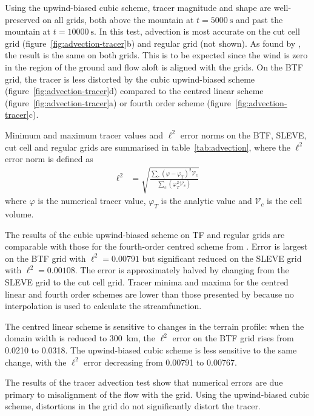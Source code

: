 \documentclass[twocol]{ametsoc}
\begin{document}
Using the upwind-biased cubic scheme, tracer magnitude and shape are well-preserved on all grids, both above the mountain at \(t = \SI{5000}{\second}\) and past the mountain at \(t = \SI{10000}{\second}\).  In this test, advection is most accurate on the cut cell grid (figure~\ref{fig:advection-tracer}b) and regular grid (not shown).  As found by \citet{good2014}, the result is the same on both grids.  This is to be expected since the wind is zero in the region of the ground and flow aloft is aligned with the grids.  On the BTF grid, the tracer is less distorted by the cubic upwind-biased scheme (figure~\ref{fig:advection-tracer}d) compared to the centred linear scheme (figure~\ref{fig:advection-tracer}a) or fourth order scheme (figure~\ref{fig:advection-tracer}c).

Minimum and maximum tracer values and \(\ell^2\) error norms on the BTF, SLEVE, cut cell and regular grids are summarised in table~\ref{tab:advection}, where the \(\ell^2\) error norm is defined as 
\begin{align}
	\ell^2 &= \sqrt{\frac{\sum_c \left( \varphi - \varphi_{T} \right)^2 \mathcal{V}_c}{\sum_c \left( \varphi_T^2 \mathcal{V}_c \right)}}
\end{align}
where $\varphi$ is the numerical tracer value, $\varphi_T$ is the analytic value and $\mathcal{V}_c$ is the cell volume.

The results of the cubic upwind-biased scheme on TF and regular grids are comparable with those for the fourth-order centred scheme from \citet{schaer2002}.  Error is largest on the BTF grid with \(\ell^2 = \num{0.00791}\) but significant reduced on the SLEVE grid with \(\ell^2 = \num{0.00108}\).  The error is approximately halved by changing from the SLEVE grid to the cut cell grid.
Tracer minima and maxima for the centred linear and fourth order schemes are lower than those presented by \citet{schaer2002} because no interpolation is used to calculate the streamfunction.

The centred linear scheme is sensitive to changes in the terrain profile: when the domain width is reduced to \SI{300}{\kilo\meter}, the $\ell^2$ error on the BTF grid rises from \num{0.0210} to \num{0.0318}.  The upwind-biased cubic scheme is less sensitive to the same change, with the $\ell^2$ error decreasing from \num{0.00791} to \num{0.00767}.

The results of the tracer advection test show that numerical errors are due primary to misalignment of the flow with the grid.  Using the upwind-biased cubic scheme, distortions in the grid do not significantly distort the tracer.
\end{document}

